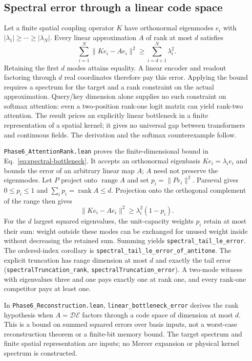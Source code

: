 \documentclass{article}
\begin{document}
\subsection{Spectral error through a linear code space}
\label{sec:supp-spectral}

Let a finite spatial coupling operator $K$ have orthonormal eigenmodes
$e_i$ with $|\lambda_1|\geq\cdots\geq|\lambda_N|$. Every linear
approximation $A$ of rank at most $d$ satisfies
\begin{equation}
 \sum_{i=1}^{N}\|Ke_i-Ae_i\|^2\geq\sum_{i=d+1}^{N}\lambda_i^2.
 \label{eq:spectral-bottleneck}
\end{equation}
Retaining the first $d$ modes attains equality. A linear encoder and readout
factoring through $d$ real coordinates therefore pay this error. Applying the
bound requires a spectrum for the target and a rank constraint on the actual
approximation. Query/key dimension alone supplies no such constraint on
softmax attention: even a two-position rank-one logit matrix can yield rank-two
attention. The result prices an explicitly linear bottleneck in a finite
representation of a spatial kernel; it gives no universal gap between
transformers and continuous fields. The derivation and the softmax
counterexample follow.


\nolinkurl{Phase6_AttentionRank.lean} proves the finite-dimensional
bound in Eq.~\eqref{eq:spectral-bottleneck}. It accepts an orthonormal
eigenbasis $Ke_i=\lambda_i e_i$ and bounds the error of an arbitrary linear
map $A$; $A$ need not preserve the eigenmodes. Let $P$ project onto
$\operatorname{range}A$ and set $p_i=\|Pe_i\|^2$. Parseval gives
$0\leq p_i\leq1$ and $\sum_i p_i=\operatorname{rank}A\leq d$.
Projection onto the orthogonal complement of the range then gives
\[
 \|Ke_i-Ae_i\|^2\geq\lambda_i^2(1-p_i).
\]
For the $d$ largest squared eigenvalues, the unit-capacity weights $p_i$
retain at most their sum: weight outside these modes can be exchanged for
unused weight inside without decreasing the retained sum. Summing yields
\nolinkurl{spectral_tail_le_error}.
The ordered-index corollary is
\nolinkurl{spectral_tail_le_error_of_antitone}.
The explicit truncation has range dimension at most $d$ and exactly the tail
error (\nolinkurl{spectralTruncation_rank},
\nolinkurl{spectralTruncation_error}). A two-mode witness with
eigenvalues three and one pays exactly one at rank one, and every rank-one
competitor pays at least one.

In \nolinkurl{Phase6_Reconstruction.lean},
\nolinkurl{linear_bottleneck_error} derives the rank
hypothesis when $A=\mathcal{D}\mathcal{E}$ factors through a code space of
dimension at most $d$. This is a bound on summed squared errors over basis
inputs, not a worst-case reconstruction theorem or a finite-bit memory bound.
The target spectrum and finite spatial representation are inputs; no Mercer
expansion or physical kernel spectrum is constructed.
\end{document}
